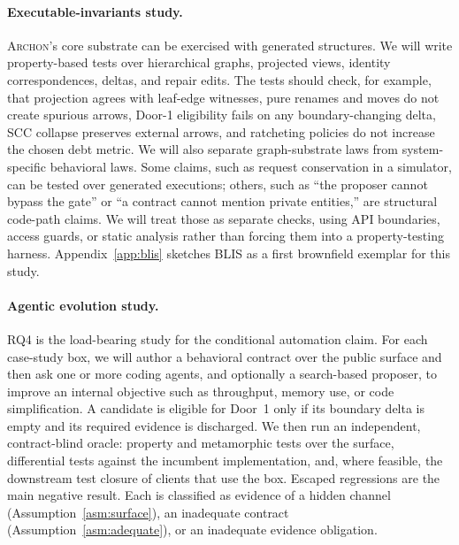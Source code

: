 \documentclass[sigconf,review,anonymous]{acmart}
\theoremstyle{plain}
\theoremstyle{definition}
\begin{document}
\paragraph{Executable-invariants study.}
\textsc{Archon}'s core substrate can be exercised with generated structures. We will
write property-based tests over hierarchical graphs, projected views, identity
correspondences, deltas, and repair edits. The tests should check, for
example, that projection agrees with leaf-edge witnesses, pure renames and moves
do not create spurious arrows, Door-1 eligibility fails on any boundary-changing
delta, SCC collapse preserves external arrows, and ratcheting policies do not
increase the chosen debt metric. We will also separate graph-substrate laws from
system-specific behavioral laws. Some claims, such as request conservation in a
simulator, can be tested over generated executions; others, such as ``the
proposer cannot bypass the gate'' or ``a contract cannot mention private
entities,'' are structural code-path claims. We will treat those as separate
checks, using API boundaries, access guards, or static analysis rather than
forcing them into a property-testing harness. Appendix~\ref{app:blis} sketches
BLIS as a first brownfield exemplar for this study.

\paragraph{Agentic evolution study.}
RQ4 is the load-bearing study for the conditional automation claim. For each
case-study box, we will author a behavioral contract over the public surface and
then ask one or more coding agents, and optionally a search-based proposer, to
improve an internal objective such as throughput, memory use, or code
simplification. A candidate is eligible for Door~1 only if its boundary delta is
empty and its required evidence is discharged. We then run an independent,
contract-blind oracle: property and metamorphic tests over the surface,
differential tests against the incumbent implementation, and, where feasible,
the downstream test closure of clients that use the box. Escaped regressions are
the main negative result. Each is classified as evidence of a hidden channel
(Assumption~\ref{asm:surface}), an inadequate contract
(Assumption~\ref{asm:adequate}), or an inadequate evidence obligation.
\end{document}
